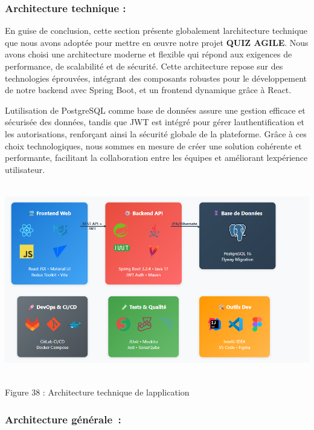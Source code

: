 \documentclass[12pt,a4paper,twoside,openright]{report}
\begin{document}
\hypertarget{architecture-technique}{%
\subsubsection{Architecture technique :}\label{architecture-technique}}

En guise de conclusion, cette section présente globalement
l\textquotesingle architecture technique que nous avons adoptée pour
mettre en œuvre notre projet \textbf{QUIZ AGILE}. Nous avons choisi une
architecture moderne et flexible qui répond aux exigences de
performance, de scalabilité et de sécurité. Cette architecture repose
sur des technologies éprouvées, intégrant des composants robustes pour
le développement de notre backend avec Spring Boot, et un frontend
dynamique grâce à React.

L\textquotesingle utilisation de PostgreSQL comme base de données assure
une gestion efficace et sécurisée des données, tandis que JWT est
intégré pour gérer l\textquotesingle authentification et les
autorisations, renforçant ainsi la sécurité globale de la plateforme.
Grâce à ces choix technologiques, nous sommes en mesure de créer une
solution cohérente et performante, facilitant la collaboration entre les
équipes et améliorant l\textquotesingle expérience utilisateur.

\includegraphics[width=6.03941in,height=3.29328in]{latex_media/media/image44.png}

\protect\hypertarget{_Toc203823448}{}{}Figure 38 : Architecture
technique de l\textquotesingle application

\hypertarget{architecture-guxe9nuxe9rale}{%
\subsubsection{Architecture
générale~:}\label{architecture-guxe9nuxe9rale}}
\end{document}
